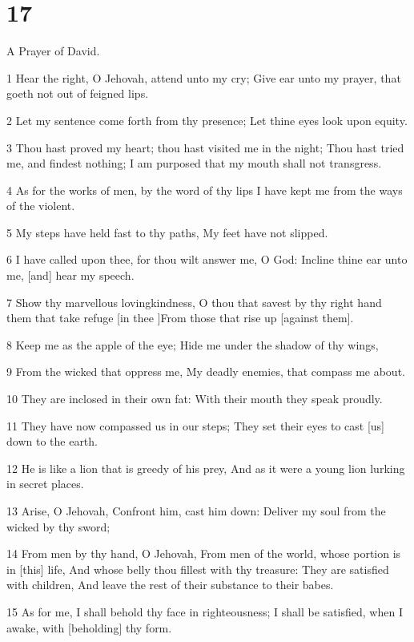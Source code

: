 \chapter{17}

\par A Prayer of David.

\par 1 Hear the right, O Jehovah, attend unto my cry; Give ear unto my prayer, that goeth not out of feigned lips.
\par 2 Let my sentence come forth from thy presence; Let thine eyes look upon equity.
\par 3 Thou hast proved my heart; thou hast visited me in the night; Thou hast tried me, and findest nothing; I am purposed that my mouth shall not transgress.
\par 4 As for the works of men, by the word of thy lips I have kept me from the ways of the violent.
\par 5 My steps have held fast to thy paths, My feet have not slipped.
\par 6 I have called upon thee, for thou wilt answer me, O God: Incline thine ear unto me, [and] hear my speech.
\par 7 Show thy marvellous lovingkindness, O thou that savest by thy right hand them that take refuge [in thee ]From those that rise up [against them].
\par 8 Keep me as the apple of the eye; Hide me under the shadow of thy wings,
\par 9 From the wicked that oppress me, My deadly enemies, that compass me about.
\par 10 They are inclosed in their own fat: With their mouth they speak proudly.
\par 11 They have now compassed us in our steps; They set their eyes to cast [us] down to the earth.
\par 12 He is like a lion that is greedy of his prey, And as it were a young lion lurking in secret places.
\par 13 Arise, O Jehovah, Confront him, cast him down: Deliver my soul from the wicked by thy sword;
\par 14 From men by thy hand, O Jehovah, From men of the world, whose portion is in [this] life, And whose belly thou fillest with thy treasure: They are satisfied with children, And leave the rest of their substance to their babes.
\par 15 As for me, I shall behold thy face in righteousness; I shall be satisfied, when I awake, with [beholding] thy form.

